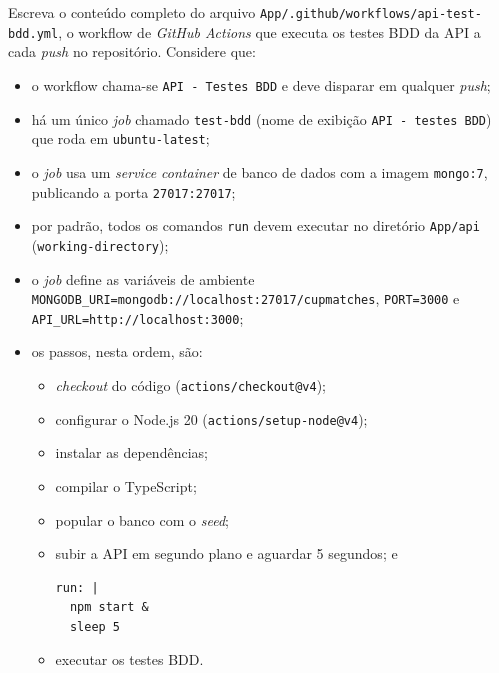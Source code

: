 
\begin{questao}[0,7 ponto]
Escreva o conteúdo completo do arquivo
\texttt{App/.github/workflows/api-test-bdd.yml}, o workflow de
\emph{GitHub Actions} que executa os testes BDD da API a cada \emph{push} no
repositório. Considere que:

\begin{itemize}
  \item o workflow chama-se \texttt{API - Testes BDD} e deve disparar em
        qualquer \emph{push};
  \item há um único \emph{job} chamado \texttt{test-bdd} (nome de exibição
        \texttt{API - testes BDD}) que roda em \texttt{ubuntu-latest};
  \item o \emph{job} usa um \emph{service container} de banco de dados com a
        imagem \texttt{mongo:7}, publicando a porta \texttt{27017:27017};
  \item por padrão, todos os comandos \texttt{run} devem executar no diretório
        \texttt{App/api} (\texttt{working-directory});
  \item o \emph{job} define as variáveis de ambiente
        \texttt{MONGODB\_URI=mongodb://localhost:27017/cupmatches},
        \texttt{PORT=3000} e \texttt{API\_URL=http://localhost:3000};
  \item os passos, nesta ordem, são: 
      \begin{itemize}
            \item \emph{checkout} do código (\texttt{actions/checkout@v4});
            \item configurar o Node.js 20 (\texttt{actions/setup-node@v4});
            \item instalar as dependências;
            \item compilar o TypeScript;
            \item popular o banco com o \emph{seed};
            \item subir a API em segundo plano e aguardar 5 segundos; e
\begin{lstlisting}
run: |
  npm start &
  sleep 5
\end{lstlisting}
            \item executar os testes BDD.
      \end{itemize}
\end{itemize}



\end{questao}

